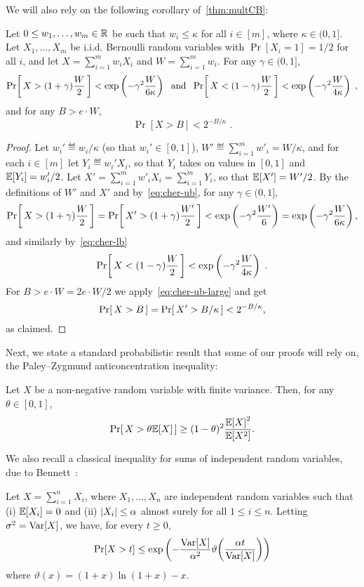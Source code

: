 \noindent We will also rely on the following corollary of~\cref{thm:multCB}:
\begin{corollary}\label{cor:sum-wiXi}
Let $0 \leq w_1,\dots,w_m \in \mathbb{R}$ be such that $w_i \leq \kappa$ for all $i \in [m]$, where $\kappa \in (0,1]$. Let $X_1,\dots,X_m$ be i.i.d. Bernoulli random variables with $\Pr[X_i=1]=1/2$ for all $i$, and let \mbox{$X = \sum_{i=1}^m w_i X_i$} and $W = \sum_{i=1}^m w_i$.
For any $\gamma \in (0,1]$,
\[
\Pr\!\left[\,  X > (1+\gamma)\frac{W}{2} \, \right]
    < \exp\left(-\gamma^2\frac{W}{6\kappa}\right)
    \;\mbox{ and }\;
\Pr\!\left[\,  X < (1-\gamma)\frac{W}{2} \, \right]
    < \exp\left(-\gamma^2\frac{W}{4\kappa}\right)\;,
\]
and for any $B > e\cdot W$,
\[
\Pr[X > B] < 2^{-B/\kappa}\;.
\]
\end{corollary}
\begin{proof}
Let $w_i' \eqdef w_i/\kappa$ (so that $w_i' \in [0,1]$), $W' \eqdef \sum_{i=1}^m w'_i = W/\kappa$, and
for each $i \in [m]$ let $Y_i \eqdef w_i' X_i$, so that $Y_i$ takes on values in $[0,1]$ and $\mathbb{E}\!\left[Y_i\right] = w'_i/2$.
Let $X' = \sum_{i=1}^m w'_i X_i = \sum_{i=1}^m Y_i$,
so that $\mathbb{E}\!\left[X'\right] = W'/2$.
By the definitions of $W'$ and $X'$ and by~\cref{eq:cher-ub},
for any $\gamma \in (0,1]$,
\[
\Pr\!\left[\,  X > (1+\gamma)\frac{W}{2} \, \right]
 = \Pr\!\left[\,  X' > (1+\gamma)\frac{W'}{2} \, \right]
    < \exp\left(-\gamma^2\frac{W'}{6}\right)
    = \exp\left(-\gamma^2\frac{W}{6\kappa}\right),
\]
and similarly by~\cref{eq:cher-lb}
\[
\Pr\!\left[\,  X < (1-\gamma)\frac{W}{2} \, \right]
    < \exp\left(-\gamma^2\frac{W}{{4}\kappa}\right)\;.
\]
For $B > e\cdot W = 2e\cdot W/2$
we apply~\cref{eq:cher-ub-large} and get
\[
\Pr\!\left[\,  X > B \, \right]
 = \Pr\!\left[\,  X' > B/\kappa \, \right]
    < 2^{-B/\kappa},
\]
as claimed.
\end{proof}

Next, we state a standard probabilistic result that some of our proofs will rely on, the Paley--Zygmund anticoncentration inequality:
\begin{theorem}\label{theo:paley:zigmund}
  Let $X$ be a non-negative random variable with finite variance. Then, for any $\theta\in[0,1]$,
  \[
      \Pr\!\left[\,  X > \theta\mathbb{E}\!\left[X\right] \, \right] \geq (1-\theta)^2\frac{\mathbb{E}\!\left[X\right]^2}{\mathbb{E}\!\left[X^2\right]}.
  \]
\end{theorem}

We also recall a classical inequality for sums of independent random variables, due to Bennett~\cite[Chapter 2]{Boucheron:13}:
\begin{theorem}
Let $X=\sum_{i=1}^n X_i$, where $X_1,\dots,X_n$ are independent random variables such that (i) $\mathbb{E}[X_i]=0$ and (ii) $\left\lvert X_i \right\rvert\leq \alpha$ almost surely for all $1\leq i\leq n$. Letting $\sigma^2=\operatorname{Var}[X]$, we have, for every $t\geq 0$,
\[
    \Pr[ X > t ] \leq \exp\left( -\frac{\operatorname{Var}[X]}{\alpha^2} \vartheta\!\left( \frac{\alpha t}{\operatorname{Var}[X]} \right) \right)
\]
where $\vartheta(x)=(1+x)\ln(1+x) - x$.
\end{theorem}

